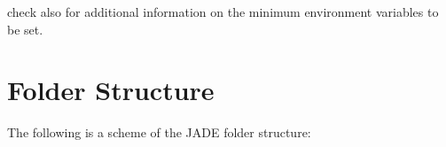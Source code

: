 \documentclass[letterpaper,10pt,english]{sphinxmanual}
\begin{document}
\sphinxAtStartPar
check also {\hyperref[\detokenize{usage/configuration:mainconfig}]{}} for additional information on the minimum environment variables
to be set.




\chapter{Folder Structure}
\label{\detokenize{usage/folders:folder-structure}}\label{\detokenize{usage/folders:folders}}\label{\detokenize{usage/folders::doc}}
\sphinxAtStartPar
The following is a scheme of the JADE folder structure:

\begin{sphinxVerbatim}[commandchars=\\\{\}]
      
                 
                 
                 
                 
                 
     
                 
                 
                 

\end{sphinxVerbatim}
\end{document}
